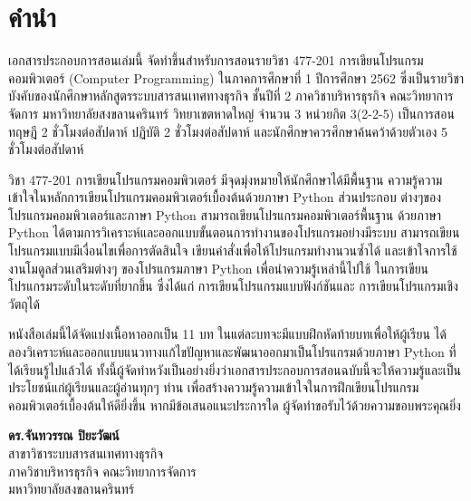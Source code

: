 \chapter{คำนำ}

เอกสารประกอบการสอนเล่มนี้ จัดทำขึ้นสำหรับการสอนรายวิชา 477-201 การเขียนโปรแกรม คอมพิวเตอร์ (Computer Programming) ในภาคการศึกษาที่ 1 ปีการศึกษา 2562 ซึ่งเป็นรายวิชาบังคับของนักศึกษาหลักสูตรระบบสารสนเทศทางธุรกิจ ชั้นปีที่ 2 ภาควิชาบริหารธุรกิจ คณะวิทยาการจัดการ มหาวิทยาลัยสงขลานครินทร์ วิทยาเขตหาดใหญ่ จำนวน 3 หน่วยกิต 3(2-2-5) เป็นการสอนทฤษฎี 2 ชั่วโมงต่อสัปดาห์ ปฏิบัติ 2 ชั่วโมงต่อสัปดาห์ และนักศึกษาควรศึกษาค้นคว้าด้วยตัวเอง 5 ชั่วโมงต่อสัปดาห์

วิชา 477-201 การเขียนโปรแกรมคอมพิวเตอร์ มีจุดมุ่งหมายให้นักศึกษาได้มีพื้นฐาน ความรู้ความเข้าใจในหลักการเขียนโปรแกรมคอมพิวเตอร์เบื้องต้นด้วยภาษา Python ส่วนประกอบ ต่างๆของโปรแกรมคอมพิวเตอร์และภาษา Python สามารถเขียนโปรแกรมคอมพิวเตอร์พื้นฐาน ด้วยภาษา Python ได้ตามการวิเคราะห์และออกแบบขั้นตอนการทำงานของโปรแกรมอย่างมีระบบ สามารถเขียนโปรแกรมแบบมีเงื่อนไขเพื่อการตัดสินใจ เขียนคำสั่งเพื่อให้โปรแกรมทำงานวนซ้ำได้ และเข้าใจการใช้งานโมดูลส่วนเสริมต่างๆ ของโปรแกรมภาษา Python เพื่อนำความรู้เหล่านี้ไปใช้ ในการเขียนโปรแกรมระดับในระดับที่ยากขึ้น ซึ่งได้แก่ การเขียนโปรแกรมแบบฟังก์ชันและ การเขียนโปรแกรมเชิงวัตถุได้

หนังสือเล่มนี้ได้จัดแบ่งเนื้อหาออกเป็น 11 บท ในแต่ละบทจะมีแบบฝึกหัดท้ายบทเพื่อให้ผู้เรียน ได้ลองวิเคราะห์และออกแบบแนวทางแก้ไขปัญหาและพัฒนาออกมาเป็นโปรแกรมด้วยภาษา Python ที่ได้เรียนรู้ไปแล้วได้ ทั้งนี้ผู้จัดทำหวังเป็นอย่างยิ่งว่าเอกสารประกอบการสอนฉบับนี้จะให้ความรู้และเป็นประโยชน์แก่ผู้เรียนและผู้อ่านทุกๆ ท่าน เพื่อสร้างความรู้ความเข้าใจในการฝึกเขียนโปรแกรมคอมพิวเตอร์เบื้องต้นให้ดียิ่งขึ้น หากมีข้อเสนอแนะประการใด ผู้จัดทำขอรับไว้ด้วยความขอบพระคุณยิ่ง

\vspace{10mm}
\noindent
\textbf{ดร.จันทวรรณ ปิยะวัฒน์}\\
สาขาวิชาระบบสารสนเทศทางธุรกิจ\\
ภาควิชาบริหารธุรกิจ คณะวิทยาการจัดการ\\
มหาวิทยาลัยสงขลานครินทร์